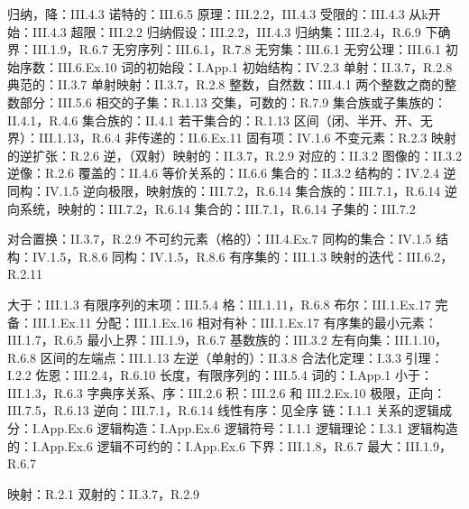 归纳，降：III.4.3 诺特的：III.6.5 原理：III.2.2，III.4.3 受限的：III.4.3 从k开始：III.4.3 超限：III.2.2 归纳假设：III.2.2，III.4.3 归纳集：III.2.4，R.6.9 下确界：III.1.9，R.6.7 无穷序列：III.6.1，R.7.8 无穷集：III.6.1 无穷公理：III.6.1 初始序数：III.6.Ex.10 词的初始段：I.App.1 初始结构：IV.2.3 单射：II.3.7，R.2.8 典范的：II.3.7 单射映射：II.3.7，R.2.8 整数，自然数：III.4.1 两个整数之商的整数部分：III.5.6 相交的子集：R.1.13 交集，可数的：R.7.9 集合族或子集族的：II.4.1，R.4.6 集合族的：II.4.1 若干集合的：R.1.13 区间（闭、半开、开、无界）：III.1.13，R.6.4 非传递的：II.6.Ex.11 固有项：IV.1.6 不变元素：R.2.3 映射的逆扩张：R.2.6 逆，（双射）映射的：II.3.7，R.2.9 对应的：II.3.2 图像的：II.3.2 逆像：R.2.6 覆盖的：II.4.6 等价关系的：II.6.6 集合的：II.3.2 结构的：IV.2.4 逆同构：IV.1.5 逆向极限，映射族的：III.7.2，R.6.14 集合族的：III.7.1，R.6.14 逆向系统，映射的：III.7.2，R.6.14 集合的：III.7.1，R.6.14 子集的：III.7.2

对合置换：II.3.7，R.2.9 不可约元素（格的）：III.4.Ex.7 同构的集合：IV.1.5 结构：IV.1.5，R.8.6 同构：IV.1.5，R.8.6 有序集的：III.1.3 映射的迭代：III.6.2，R.2.11

大于：III.1.3 有限序列的末项：III.5.4 格：III.1.11，R.6.8 布尔：III.1.Ex.17 完备：III.1.Ex.11 分配：III.1.Ex.16 相对有补：III.1.Ex.17 有序集的最小元素：III.1.7，R.6.5 最小上界：III.1.9，R.6.7 基数族的：III.3.2 左有向集：III.1.10，R.6.8 区间的左端点：III.1.13 左逆（单射的）：II.3.8 合法化定理：I.3.3 引理：I.2.2 佐恩：III.2.4，R.6.10 长度，有限序列的：III.5.4 词的：I.App.1 小于：III.1.3，R.6.3 字典序关系、序：III.2.6 积：III.2.6 和 III.2.Ex.10 极限，正向：III.7.5，R.6.13 逆向：III.7.1，R.6.14 线性有序：见全序 链：I.1.1 关系的逻辑成分：I.App.Ex.6 逻辑构造：I.App.Ex.6 逻辑符号：I.1.1 逻辑理论：I.3.1 逻辑构造的：I.App.Ex.6 逻辑不可约的：I.App.Ex.6 下界：III.1.8，R.6.7 最大：III.1.9，R.6.7

映射：R.2.1 双射的：II.3.7，R.2.9

